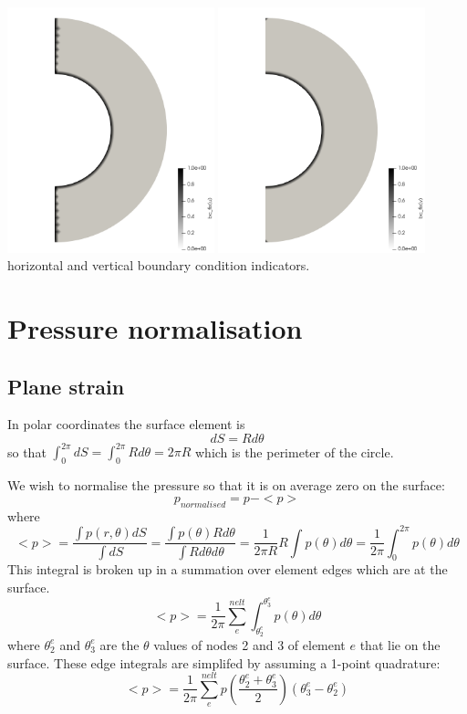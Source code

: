 \begin{center}
\includegraphics[width=6cm]{python_codes/fieldstone_152/images/bcfix_u}
\includegraphics[width=6cm]{python_codes/fieldstone_152/images/bcfix_v}\\
{\captionfont horizontal and vertical boundary condition indicators.}
\end{center}

\section*{Pressure normalisation}

\subsection*{Plane strain}

In polar coordinates the surface element is 
\[
dS = R d\theta
\]
so that 
$\int_0^{2\pi} dS = \int_0^{2\pi} R d\theta = 2 \pi R$ which is the perimeter of the circle.

We wish to normalise the pressure so that it is on average zero on the surface:
\[
p_{normalised} = p - <p>
\]
where 
\[
<p> 
= \frac{\int p(r, \theta) dS }{\int dS}
= \frac{\int p(\theta) R d\theta }{\int R d \theta d\theta}
= \frac{1}{2 \pi R} R \int p(\theta) d\theta 
= \frac{1}{2 \pi }  \int_0^{2\pi} p(\theta) d\theta 
\]
This integral is broken up in a summation over element edges which are at the surface.
\[
<p>= \frac{1}{2\pi} \sum_{e}^{nelt} \int_{\theta_{2}^e}^{\theta_{3}^e} p (\theta) d\theta
\]
where $\theta_2^e$ and $\theta_3^e$ are the $\theta$ values of nodes 2 and 3 of element $e$ that lie on the surface.
These edge integrals are simplifed by assuming a 1-point quadrature:
\[
<p>= \frac{1}{2\pi} \sum_{e}^{nelt}  p (\frac{\theta_2^e+\theta_3^e}{2}) (\theta_3^e-\theta_2^e)
\]




